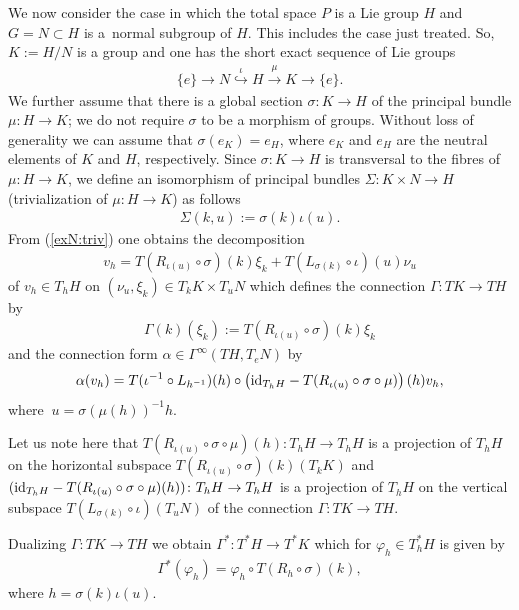 \documentclass[pdftex]{sigma}
\renewcommand{\to}{\rightarrow}
\newcommand{\id}{\text{\upshape id}}
\numberwithin{equation}{section}
\begin{document}
We now consider the case in which the total space $P$ is a Lie group $H$ and $G=N\subset H$ is a~normal subgroup of $H$. This includes the case just treated. So, $K:=H/N$ is a group and one has the short exact sequence of Lie groups
\begin{gather*}
\{e\}\to N\stackrel{\iota}{\hookrightarrow} H\stackrel{\mu}{\to} K\to \{e\}.
\end{gather*}
We further assume that there is a global section $\sigma\colon K\to H$ of the principal bundle $\mu\colon H\to K$; we do not require $\sigma$ to be a morphism of groups. Without loss of generality we can assume that $\sigma(e_K)=e_H$, where $e_K$ and $e_H$ are the neutral elements of $K$ and $H$, respectively. Since $\sigma\colon K\to H$ is transversal to the f\/ibres of $\mu\colon H\to K$, we def\/ine an isomorphism of principal bundles $\Sigma\colon K\times N\to H$ (trivialization of $\mu\colon H\to K$) as follows
 \begin{gather}\label{exN:triv} \Sigma(k,u):=\sigma(k)\iota(u).\end{gather}
 From (\ref{exN:triv}) one obtains the decomposition
 \begin{gather}\label{exN:decomp} v_h=T(R_{\iota(u)}\circ \sigma)(k)\xi_k+T(L_{\sigma(k)}\circ\iota)(u)\nu_u\end{gather}
 of $v_h\in T_hH$ on $(\nu_u,\xi_k)\in T_kK \times T_uN$ which def\/ines the connection $\Gamma\colon TK\to TH$ by
 \begin{gather*} \Gamma(k)(\xi_k):=T(R_{\iota(u)}\circ\sigma)(k)\xi_k \end{gather*}
 and the connection form $\alpha\in\Gamma^\infty(TH,T_eN)$ by
 \begin{gather}\label{exN:form} \alpha(v_h)=T(\iota^{-1}\circ L_{h^{-1}})(h)\circ \left(\id_{T_hH}-T(R_{\iota(u)}\circ\sigma\circ \mu)\right)(h)v_h,\end{gather}
 where $\ u=\sigma(\mu(h))^{-1}h$.

 Let us note here that $T(R_{\iota(u)}\circ\sigma\circ \mu)(h)\colon T_hH\to T_hH$ is a projection of $T_hH$ on the horizontal subspace $T(R_{\iota(u)}\circ\sigma)(k)(T_kK)$ and $(\id_{T_hH}-T(R_{\iota(u)}\circ\sigma\circ \mu)(h))\colon T_hH\to T_hH$ is a projection of $T_hH$ on the vertical subspace $T(L_{\sigma(k)}\circ \iota)(T_uN)$ of the connection $\Gamma\colon TK\to TH$.

 Dualizing $\Gamma\colon TK\to TH$ we obtain $\Gamma^*\colon T^*H\to T^*K$ which for $\varphi_h\in T^*_hH$ is given by
 \begin{gather}\label{exN:Gdual} \Gamma^*(\varphi_h)=\varphi_h\circ T(R_h\circ \sigma)(k),\end{gather}
where $h=\sigma(k)\iota(u)$.
\end{document}
